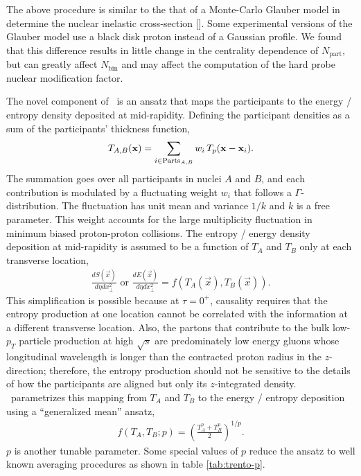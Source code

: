 The above procedure is similar to the that of a Monte-Carlo Glauber model in determine the nuclear inelastic cross-section [].
Some experimental versions of the Glauber model use a black disk proton instead of a Gaussian profile.
We found that this difference results in little change in the centrality dependence of $N_{\textrm{part}}$, but can greatly affect $N_{\textrm{bin}}$ and may affect the computation of the hard probe nuclear modification factor.

The novel component of \trento\ is an ansatz that maps the participants to the energy / entropy density deposited at mid-rapidity.
Defining the participant densities as a sum of the participants' thickness function,
\begin{equation}
T_{A, B}(\mathbf x) = \sum_{i\in \textrm{Parts}_{A, B}} w_i\, T_p(\mathbf x - \mathbf x_i).
\end{equation}
The summation goes over all participants in nuclei $A$ and $B$, and each contribution is modulated by a fluctuating weight $w_i$ that follows a $\Gamma$-distribution.
The fluctuation has unit mean and variance $1/k$ and $k$ is a free parameter.
This weight accounts for the large multiplicity fluctuation in minimum biased proton-proton collisions.
The entropy / energy density deposition at mid-rapidity is assumed to be a function of $T_A$ and $T_B$ only at each transverse location,
\begin{eqnarray}
\frac{dS(\vec{x})}{d\eta dx_\perp^2} \textrm{ or } \frac{dE(\vec{x})}{d\eta dx_\perp^2} = f(T_A(\vec{x}), T_B(\vec{x})).
\end{eqnarray}
This simplification is possible because at $\tau=0^+$, causality requires that the entropy production at one location cannot be correlated with the information at a different transverse location. 
Also, the partons that contribute to the bulk low-$p_T$ particle production at high $\sqrt{s}$ are predominately low energy gluons whose longitudinal wavelength is longer than the contracted proton radius in the $z$-direction; therefore, the entropy production should not be sensitive to the details of how the participants are aligned but only its $z$-integrated density.
\trento\ parametrizes this mapping from $T_A$ and $T_B$ to the energy / entropy deposition using a ``generalized mean'' ansatz,
\begin{eqnarray}
f(T_A, T_B; p) = \left(\frac{T_A^p + T_B^p}{2}\right)^{1/p}.
\end{eqnarray}
$p$ is another tunable parameter.
Some special values of $p$ reduce the ansatz to well known averaging procedures as shown in table \ref{tab:trento-p}.
